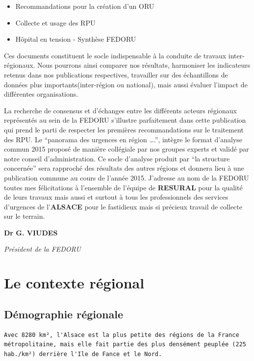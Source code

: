 \documentclass[]{article}
\begin{document}
\begin{itemize}
\itemsep1pt\parskip0pt
\item
  Recommandations pour la création d'un ORU
\item
  Collecte et usage des RPU
\item
  Hôpital en tension - Synthèse FEDORU
\end{itemize}

Ces documents constituent le socle indispensable à la conduite de
travaux inter-régionaux. Nous pourrons ainsi comparer nos résultats,
harmoniser les indicateurs retenus dans nos publications respectives,
travailler sur des échantillons de données plus importants(inter-région
ou national), mais aussi évaluer l'impact de différentes organisations.

La recherche de consensus et d'échanges entre les différents acteurs
régionaux représentés au sein de la FEDORU s'illustre parfaitement dans
cette publication qui prend le parti de respecter les premières
recommandations sur le traitement des RPU. Le ``panorama des urgences en
région \ldots{}.'', intègre le format d'analyse commun 2015 proposé de
manière collégiale par nos groupes experts et validé par notre conseil
d'administration. Ce socle d'analyse produit par ``la structure
concernée'' sera rapproché des résultats des autres régions et donnera
lieu à une publication commune au cours de l'année 2015. J'adresse au
nom de la FEDORU toutes mes félicitations à l'ensemble de l'équipe de
\textbf{RESURAL} pour la qualité de leurs travaux mais aussi et surtout
à tous les professionnels des services d'urgences de l'\textbf{ALSACE}
pour le fastidieux mais si précieux travail de collecte sur le terrain.

\textbf{Dr G. VIUDES}

\emph{Président de la FEDORU}

\section{Le contexte régional}\label{le-contexte-regional}

\subsection{Démographie régionale}\label{demographie-regionale}

\begin{verbatim}
Avec 8280 km², l'Alsace est la plus petite des régions de la France métropolitaine, mais elle fait partie des plus densément peuplée (225 hab./km²) derrière l'Ile de Fance et le Nord.
\end{verbatim}
\end{document}
